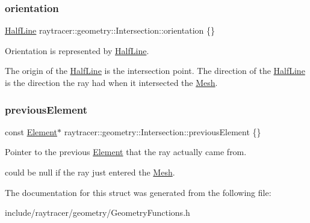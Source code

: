 \subsubsection{\texorpdfstring{orientation}{orientation}}
{\footnotesize\ttfamily \hyperlink{structraytracer_1_1geometry_1_1HalfLine}{Half\+Line} raytracer\+::geometry\+::\+Intersection\+::orientation \{\}}



Orientation is represented by \hyperlink{structraytracer_1_1geometry_1_1HalfLine}{Half\+Line}. 

The origin of the \hyperlink{structraytracer_1_1geometry_1_1HalfLine}{Half\+Line} is the intersection point. The direction of the \hyperlink{structraytracer_1_1geometry_1_1HalfLine}{Half\+Line} is the direction the ray had when it intersected the \hyperlink{classraytracer_1_1geometry_1_1Mesh}{Mesh}. \mbox{\label{structraytracer_1_1geometry_1_1Intersection_a22c5bb7b48818d87ff42cd426d5ac910}} 
\subsubsection{\texorpdfstring{previous\+Element}{previousElement}}
{\footnotesize\ttfamily const \hyperlink{classraytracer_1_1geometry_1_1Element}{Element}$\ast$ raytracer\+::geometry\+::\+Intersection\+::previous\+Element \{\}}



Pointer to the previous \hyperlink{classraytracer_1_1geometry_1_1Element}{Element} that the ray actually came from. 

could be null if the ray just entered the \hyperlink{classraytracer_1_1geometry_1_1Mesh}{Mesh}. 

The documentation for this struct was generated from the following file\+:\begin{DoxyCompactItemize}
\item 
include/raytracer/geometry/Geometry\+Functions.\+h\end{DoxyCompactItemize}
